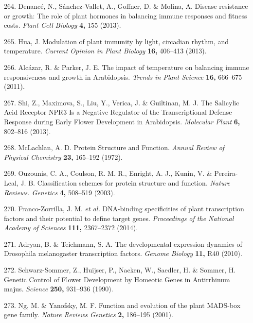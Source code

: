 \documentclass[12pt,]{book}
\begin{document}
\hypertarget{ref-denance_disease_2013}{}
264. Denancé, N., Sánchez-Vallet, A., Goffner, D. \& Molina, A. Disease
resistance or growth: The role of plant hormones in balancing immune
responses and fitness costs. \emph{Plant Cell Biology} \textbf{4,} 155
(2013).

\hypertarget{ref-hua_modulation_2013}{}
265. Hua, J. Modulation of plant immunity by light, circadian rhythm,
and temperature. \emph{Current Opinion in Plant Biology} \textbf{16,}
406--413 (2013).

\hypertarget{ref-alcazar_impact_2011}{}
266. Alcázar, R. \& Parker, J. E. The impact of temperature on balancing
immune responsiveness and growth in Arabidopsis. \emph{Trends in Plant
Science} \textbf{16,} 666--675 (2011).

\hypertarget{ref-shi_salicylic_2013}{}
267. Shi, Z., Maximova, S., Liu, Y., Verica, J. \& Guiltinan, M. J. The
Salicylic Acid Receptor NPR3 Is a Negative Regulator of the
Transcriptional Defense Response during Early Flower Development in
Arabidopsis. \emph{Molecular Plant} \textbf{6,} 802--816 (2013).

\hypertarget{ref-mclachlan_protein_1972}{}
268. McLachlan, A. D. Protein Structure and Function. \emph{Annual
Review of Physical Chemistry} \textbf{23,} 165--192 (1972).

\hypertarget{ref-ouzounis_classification_2003}{}
269. Ouzounis, C. A., Coulson, R. M. R., Enright, A. J., Kunin, V. \&
Pereira-Leal, J. B. Classification schemes for protein structure and
function. \emph{Nature Reviews. Genetics} \textbf{4,} 508--519 (2003).

\hypertarget{ref-franco_zorrilla_dna_binding_2014}{}
270. Franco-Zorrilla, J. M. \emph{et al.} DNA-binding specificities of
plant transcription factors and their potential to define target genes.
\emph{Proceedings of the National Academy of Sciences} \textbf{111,}
2367--2372 (2014).

\hypertarget{ref-adryan_developmental_2010}{}
271. Adryan, B. \& Teichmann, S. A. The developmental expression
dynamics of Drosophila melanogaster transcription factors. \emph{Genome
Biology} \textbf{11,} R40 (2010).

\hypertarget{ref-schwarz_sommer_genetic_1990}{}
272. Schwarz-Sommer, Z., Huijser, P., Nacken, W., Saedler, H. \& Sommer,
H. Genetic Control of Flower Development by Homeotic Genes in
Antirrhinum majus. \emph{Science} \textbf{250,} 931--936 (1990).

\hypertarget{ref-ng_mads_review_2001}{}
273. Ng, M. \& Yanofsky, M. F. Function and evolution of the plant
MADS-box gene family. \emph{Nature Reviews Genetics} \textbf{2,}
186--195 (2001).
\end{document}
